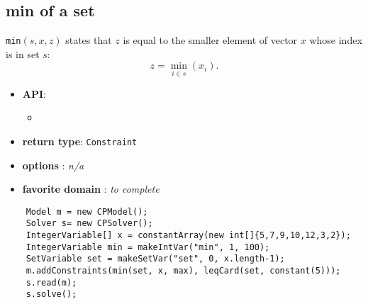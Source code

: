 \subsection{min of a set}\label{min:minofaset}\hypertarget{min:minofaset}{}

\begin{notedef}
  \texttt{min}$(s,x,z)$ states that $z$ is equal to the smaller
  element of vector $x$ whose index is in set $s$:
$$z = \min_{i\in s}( x_i ).$$
\end{notedef}
\begin{itemize}
	\item \textbf{API}:
	\begin{itemize}
		\item {}
	\end{itemize}
	\item \textbf{return type}: \texttt{Constraint}
	\item \textbf{options} : \emph{n/a}
	\item \textbf{favorite domain} : \emph{to complete}
\end{itemize}

\begin{lstlisting}
	Model m = new CPModel();
	Solver s= new CPSolver();
	IntegerVariable[] x = constantArray(new int[]{5,7,9,10,12,3,2});
	IntegerVariable min = makeIntVar("min", 1, 100);
	SetVariable set = makeSetVar("set", 0, x.length-1);
	m.addConstraints(min(set, x, max), leqCard(set, constant(5)));
	s.read(m);
	s.solve();
\end{lstlisting}
